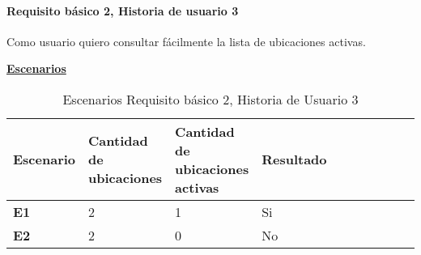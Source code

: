 \documentclass[../ei103948-project-documentation.tex]{subfiles}
\begin{document}
						\testBasicoN
						\newpage

				\paragraph{Requisito básico 2, Historia de usuario 3}
				Como usuario quiero consultar fácilmente la lista de ubicaciones activas.

				\begin{center}
					\textbf{\underline{Escenarios}}
					\begin{table}[H]
						\centering
						\begin{tabular}{|p{0.14\linewidth}|p{0.20\linewidth}|p{0.20\linewidth}|p{0.20\linewidth}|p{0.12\linewidth}|p{0.12\linewidth}|p{0.12\linewidth}|}
							\hline
							\textbf{Escenario} & \textbf{Cantidad de ubicaciones} & \textbf{Cantidad de ubicaciones activas} & \textbf{Resultado} \\ \hline
							\textbf{E1}        & 2                                & 1                                        & Si                 \\ \hline
							\textbf{E2}        & 2                                & 0                                        & No                 \\ \hline
							\end{tabular}
						\caption{Escenarios Requisito básico 2, Historia de Usuario 3}
					\end{table}

					\descripcionBasicaO


\end{center}
\end{document}

